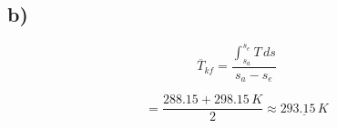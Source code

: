 

\subsection*{b)}

\[
\overline{T}_{kf} = \frac{\int_{s_a}^{s_e} T \, ds}{s_a - s_e}
\]

\[
= \frac{288.15 + 298.15 \, K}{2} \approx \underline{293.15 \, K}
\]